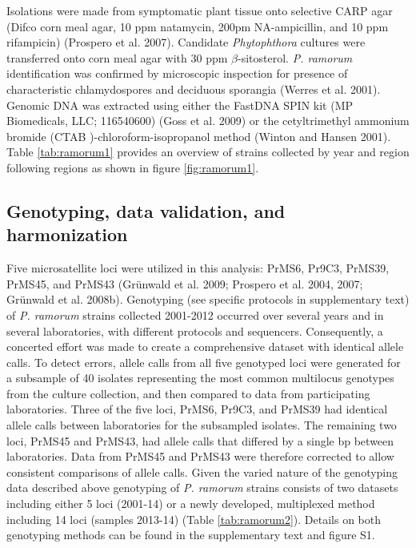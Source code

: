 \documentclass[double,12pt]{beavtex}
\begin{document}
  Isolations were made from symptomatic plant tissue onto selective CARP
  agar (Difco corn meal agar, 10 ppm natamycin, 200pm NA-ampicillin, and
  10 ppm rifampicin) (Prospero et al. 2007). Candidate \emph{Phytophthora}
  cultures were transferred onto corn meal agar with 30 ppm
  \(\beta\)-sitosterol. \emph{P. ramorum} identification was confirmed by
  microscopic inspection for presence of characteristic chlamydospores and
  deciduous sporangia (Werres et al. 2001). Genomic DNA was extracted
  using either the FastDNA SPIN kit (MP Biomedicals, LLC; 116540600) (Goss
  et al. 2009) or the cetyltrimethyl ammonium bromide (CTAB
  )-chloroform-isopropanol method (Winton and Hansen 2001). Table
  \ref{tab:ramorum1} provides an overview of strains collected by year and
  region following regions as shown in figure \ref{fig:ramorum1}.
  
  \subsection{Genotyping, data validation, and
  harmonization}\label{genotyping-data-validation-and-harmonization}
  
  Five microsatellite loci were utilized in this analysis: PrMS6, Pr9C3,
  PrMS39, PrMS45, and PrMS43 (Grünwald et al. 2009; Prospero et al. 2004,
  2007; Grünwald et al. 2008b). Genotyping (see specific protocols in
  supplementary text) of \emph{P. ramorum} strains collected 2001-2012
  occurred over several years and in several laboratories, with different
  protocols and sequencers. Consequently, a concerted effort was made to
  create a comprehensive dataset with identical allele calls. To detect
  errors, allele calls from all five genotyped loci were generated for a
  subsample of 40 isolates representing the most common multilocus
  genotypes from the culture collection, and then compared to data from
  participating laboratories. Three of the five loci, PrMS6, Pr9C3, and
  PrMS39 had identical allele calls between laboratories for the
  subsampled isolates. The remaining two loci, PrMS45 and PrMS43, had
  allele calls that differed by a single bp between laboratories. Data
  from PrMS45 and PrMS43 were therefore corrected to allow consistent
  comparisons of allele calls. Given the varied nature of the genotyping
  data described above genotyping of \emph{P. ramorum} strains consists of
  two datasets including either 5 loci (2001-14) or a newly developed,
  multiplexed method including 14 loci (samples 2013-14) (Table
  \ref{tab:ramorum2}). Details on both genotyping methods can be found in
  the supplementary text and figure S1.
  
\end{document}
